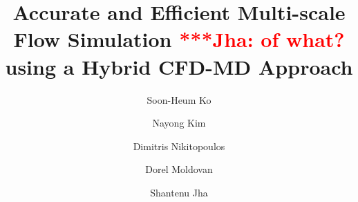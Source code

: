 \documentclass[preprint,12pt]{elsarticle}
\newcommand{\jhanote}[1]{ {\textcolor{red} { ***Jha: #1 }}}
\newcommand{\jhanote}[1]{}
\begin{document}
\begin{frontmatter}



\title{Accurate and Efficient Multi-scale Flow Simulation \jhanote{of
    what?} using a Hybrid CFD-MD Approach}
\author[add1]{Soon-Heum Ko}
\author[add1]{Nayong Kim}
\author[add3]{Dimitris Nikitopoulos}
\author[add3]{Dorel Moldovan}
\author[add1,add2]{Shantenu Jha}
\address[add1]{Center for Computation \& Technology, Louisiana State University, Baton Rouge, LA 70803, USA}
\address[add2]{Department of Computer Science, Louisiana State University, Baton Rouge, LA 70803, USA}
\address[add3]{Department of Mechanical Engineering, Louisiana State University, Baton Rouge, LA 70803, USA}


\end{frontmatter}
\end{document}

